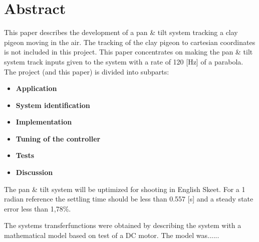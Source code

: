 
\setcounter{page}{1}
\section*{Abstract}

This paper describes the development of a pan \& tilt system tracking a clay 
pigeon moving in the air. 
The tracking of the clay pigeon to cartesian coordinates is not included in this 
project. This paper concentrates on making the pan \& tilt system track inputs 
given to the system with a rate of 120 [Hz] of a parabola.
The project (and this paper) is divided into subparts: 
 
\begin{itemize}
  \item \textbf{Application}
  \item \textbf{System identification} 
  \item \textbf{Implementation}
  \item \textbf{Tuning of the controller} 
  \item \textbf{Tests} 
  \item \textbf{Discussion} 
\end{itemize}

The pan \& tilt system will be uptimized for shooting in English Skeet. For a 1 
radian reference the settling time should be less than 0.557 [s] and a steady 
state error less than 1,78\%.

The systems transferfunctions were obtained by describing the system with a 
mathematical model based on test of a DC motor. The model was......



